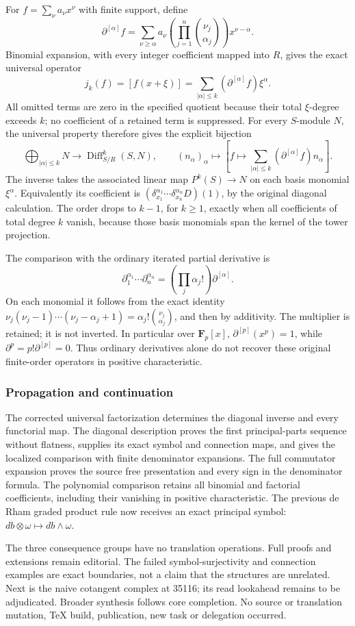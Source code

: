 For \(f=\sum_\nu a_\nu x^\nu\) with finite support, define \[
\partial^{[\alpha]}f
=\sum_{\nu\ge\alpha}a_\nu\left(\prod_{j=1}^n\binom{\nu_j}{\alpha_j}\right)x^{\nu-\alpha}.
\] Binomial expansion, with every integer coefficient mapped into \(R\), gives the exact universal operator \[
j_k(f)=[f(x+\xi)]=\sum_{|\alpha|\le k}(\partial^{[\alpha]}f)\xi^\alpha.
\] All omitted terms are zero in the specified quotient because their total \(\xi\)-degree exceeds \(k\); no coefficient of a retained term is suppressed. For every \(S\)-module \(N\), the universal property therefore gives the explicit bijection \[
\bigoplus_{|\alpha|\le k}N\longrightarrow\operatorname{Diff}^k_{S/R}(S,N),
\qquad(n_\alpha)_\alpha\longmapsto\left[f\mapsto\sum_{|\alpha|\le k}(\partial^{[\alpha]}f)n_\alpha\right].
\] The inverse takes the associated linear map \(P^k(S)\to N\) on each basis monomial \(\xi^\alpha\). Equivalently its coefficient is \((\delta_{x_1}^{\alpha_1}\cdots\delta_{x_n}^{\alpha_n}D)(1)\), by the original diagonal calculation. The order drops to \(k-1\), for \(k\ge1\), exactly when all coefficients of total degree \(k\) vanish, because those basis monomials span the kernel of the tower projection.

The comparison with the ordinary iterated partial derivative is \[
\partial_1^{\alpha_1}\cdots\partial_n^{\alpha_n}
=\left(\prod_j\alpha_j!\right)\partial^{[\alpha]}.
\] On each monomial it follows from the exact identity \(\nu_j(\nu_j-1)\cdots(\nu_j-\alpha_j+1)=\alpha_j!\binom{\nu_j}{\alpha_j}\), and then by additivity. The multiplier is retained; it is not inverted. In particular over \(\mathbf F_p[x]\), \(\partial^{[p]}(x^p)=1\), while \(\partial^p=p!\partial^{[p]}=0\). Thus ordinary derivatives alone do not recover these original finite-order operators in positive characteristic.

\subsubsection{Propagation and continuation}\label{algebra-proof-043-propagation-and-continuation}

The corrected universal factorization determines the diagonal inverse and every functorial map. The diagonal description proves the first principal-parts sequence without flatness, supplies its exact symbol and connection maps, and gives the localized comparison with finite denominator expansions. The full commutator expansion proves the source free presentation and every sign in the denominator formula. The polynomial comparison retains all binomial and factorial coefficients, including their vanishing in positive characteristic. The previous de Rham graded product rule now receives an exact principal symbol: \(db\otimes\omega\mapsto db\wedge\omega\).

The three consequence groups have no translation operations. Full proofs and extensions remain editorial. The failed symbol-surjectivity and connection examples are exact boundaries, not a claim that the structures are unrelated. Next is the naive cotangent complex at 35116; its read lookahead remains to be adjudicated. Broader synthesis follows core completion. No source or translation mutation, TeX build, publication, new task or delegation occurred.
